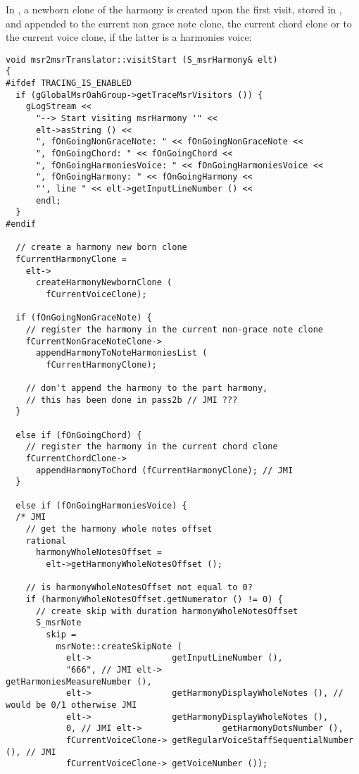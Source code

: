 In , a newborn clone of the harmony is created upon the first visit, stored in , and appended to the current non grace note clone, the current chord clone or to the current voice clone, if the latter is a harmonies voice: %
\begin{lstlisting}[language=CPlusPlus]
void msr2msrTranslator::visitStart (S_msrHarmony& elt)
{
#ifdef TRACING_IS_ENABLED
  if (gGlobalMsrOahGroup->getTraceMsrVisitors ()) {
    gLogStream <<
      "--> Start visiting msrHarmony '" <<
      elt->asString () <<
      ", fOnGoingNonGraceNote: " << fOnGoingNonGraceNote <<
      ", fOnGoingChord: " << fOnGoingChord <<
      ", fOnGoingHarmoniesVoice: " << fOnGoingHarmoniesVoice <<
      ", fOnGoingHarmony: " << fOnGoingHarmony <<
      "', line " << elt->getInputLineNumber () <<
      endl;
  }
#endif

  // create a harmony new born clone
  fCurrentHarmonyClone =
    elt->
      createHarmonyNewbornClone (
        fCurrentVoiceClone);

  if (fOnGoingNonGraceNote) {
    // register the harmony in the current non-grace note clone
    fCurrentNonGraceNoteClone->
      appendHarmonyToNoteHarmoniesList (
        fCurrentHarmonyClone);

    // don't append the harmony to the part harmony,
    // this has been done in pass2b // JMI ???
  }

  else if (fOnGoingChord) {
    // register the harmony in the current chord clone
    fCurrentChordClone->
      appendHarmonyToChord (fCurrentHarmonyClone); // JMI
  }

  else if (fOnGoingHarmoniesVoice) {
  /* JMI
    // get the harmony whole notes offset
    rational
      harmonyWholeNotesOffset =
        elt->getHarmonyWholeNotesOffset ();

    // is harmonyWholeNotesOffset not equal to 0?
    if (harmonyWholeNotesOffset.getNumerator () != 0) {
      // create skip with duration harmonyWholeNotesOffset
      S_msrNote
        skip =
          msrNote::createSkipNote (
            elt->                getInputLineNumber (),
            "666", // JMI elt->                getHarmoniesMeasureNumber (),
            elt->                getHarmonyDisplayWholeNotes (), // would be 0/1 otherwise JMI
            elt->                getHarmonyDisplayWholeNotes (),
            0, // JMI elt->                getHarmonyDotsNumber (),
            fCurrentVoiceClone-> getRegularVoiceStaffSequentialNumber (), // JMI
            fCurrentVoiceClone-> getVoiceNumber ());


\end{lstlisting}

